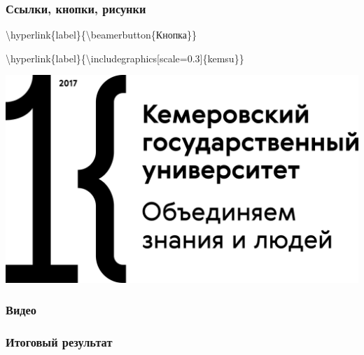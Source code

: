 \documentclass[russian, 14pt]{beamer}
\begin{document}
\begin{frame} \label{button}
	\frametitle{Ссылки, кнопки, рисунки}
	\textbackslash hyperlink\{label\}\{\textbackslash beamerbutton\{Кнопка\}\}
	
	
	\textbackslash hyperlink\{label\}\{\textbackslash includegraphics[scale=0.3]\{kemsu\}\}
	
	
	\centering\hyperlink{video}{\includegraphics[scale=0.3]{kemsu}}
\end{frame}

\begin{frame} \label{video}
	\frametitle{Видео}
\end{frame}

\begin{frame}
	\frametitle{Итоговый результат}
\end{frame}
\end{document}
